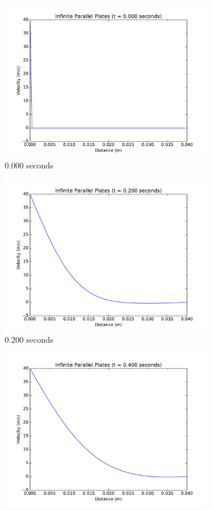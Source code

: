 \documentclass[addpoints]{exam}
\begin{document}
\begin{questions}
\begin{parts}
\begin{solution}
\begin{itemize}
\begin{figure}[H]
\begin{subfigure}{.5\textwidth}
  \centering
  \includegraphics[width=.8\linewidth]{figs/0-000_sec_plot_CN1.pdf}
  \caption{$0.000$ seconds}
  \label{fig:0.0_CN1}
\end{subfigure}%
\begin{subfigure}{.5\textwidth}
  \centering
  \includegraphics[width=.8\linewidth]{figs/0-200_sec_plot_CN1.pdf}
  \caption{$0.200$ seconds}
  \label{fig:0.2_CN1}
\end{subfigure}
\begin{subfigure}{.5\textwidth}
  \centering
  \includegraphics[width=.8\linewidth]{figs/0-400_sec_plot_CN1.pdf}

\end{subfigure}
\end{figure}
\end{itemize}
\end{solution}
\end{parts}
\end{questions}
\end{document}
